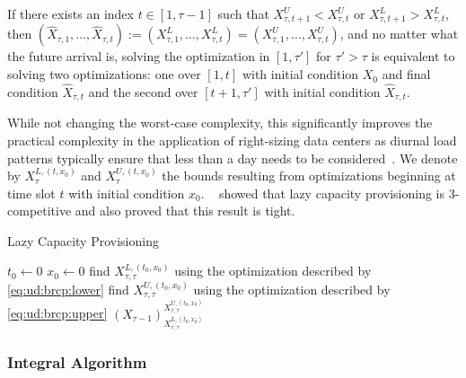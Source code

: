 \begin{lemma}
\cite{Lin2011} If there exists an index $t \in [1, \tau-1]$ such that $X_{\tau,t+1}^U < X_{\tau,t}^U$ or $X_{\tau,t+1}^L > X_{\tau,t}^L$, then $(\hat{X}_{\tau,1},\dots,\hat{X}_{\tau,t}) := (X_{\tau,1}^L,\dots,X_{\tau,t}^L) = (X_{\tau,1}^U,\dots,X_{\tau,t}^U)$, and no matter what the future arrival is, solving the optimization in $[1,\tau']$ for $\tau' > \tau$ is equivalent to solving two optimizations: one over $[1,t]$ with initial condition $X_0$ and final condition $\hat{X}_{\tau,t}$ and the second over $[t+1,\tau']$ with initial condition $\hat{X}_{\tau,t}$.
\end{lemma}

While not changing the worst-case complexity, this significantly improves the practical complexity in the application of right-sizing data centers as diurnal load patterns typically ensure that less than a day needs to be considered~\cite{Lin2011}. We denote by $X_{\tau}^{L,(t,x_0)}$ and $X_{\tau}^{U,(t,x_0)}$ the bounds resulting from optimizations beginning at time slot $t$ with initial condition $x_0$. \citeauthor*{Lin2011}~\cite{Lin2011} showed that lazy capacity provisioning is $3$-competitive and also proved that this result is tight.

\begin{algorithm}
    \caption{Lazy Capacity Provisioning~\cite{Lin2011}}\label{alg:ud:lcp}
    $t_0 \gets 0$\;
    $x_0 \gets 0$\;
    find $X_{\tau,\tau}^{L,(t_0,x_0)}$ using the optimization described by \cref{eq:ud:brcp:lower}\;
    find $X_{\tau,\tau}^{U,(t_0,x_0)}$ using the optimization described by \cref{eq:ud:brcp:upper}\;
    \Return $(X_{\tau-1})_{X_{\tau,\tau}^{L,(t_0,x_0)}}^{X_{\tau,\tau}^{U,(t_0,x_0)}}$\;
\end{algorithm}

\subsubsection{Integral Algorithm}

